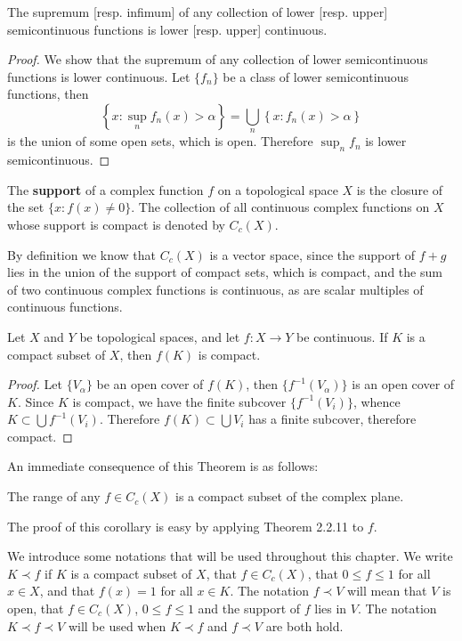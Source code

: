 \begin{proposition}
The supremum [resp. infimum] of any collection of lower [resp. upper] semicontinuous functions is lower [resp. upper] continuous.
\end{proposition}
\begin{proof}
We show that the supremum of any collection of lower semicontinuous functions is lower continuous. Let $\{f_n\}$ be a class of lower semicontinuous functions, then 
$$
\left\{ x:\mathop {\mathrm{sup}} \limits_{n}f_n\left( x \right) >\alpha \right\} =\bigcup_n{\left\{ x:f_n\left( x \right) >\alpha \right\}}
$$
is the union of some open sets, which is open. Therefore $\sup_nf_n$ is lower semicontinuous.
\end{proof}
\begin{definition}
The \textbf{support} of a complex function $f$ on a topological space $X$ is the closure of the set $\{x:f(x)\ne 0\}$. The collection of all continuous complex functions on $X$ whose support is compact is denoted by $C_c(X)$.
\end{definition}
By definition we know that $C_c(X)$ is a vector space, since the support of $f+g$ lies in the union of the support of compact sets, which is compact, and the sum of two continuous complex functions is continuous, as are scalar multiples of continuous functions.
\begin{theorem}
Let $X$ and $Y$ be topological spaces, and let $f:X\to Y$ be continuous. If $K$ is a compact subset of $X$, then $f(K)$ is compact.
\end{theorem}
\begin{proof}
Let $\{V_\alpha\}$ be an open cover of $f(K)$, then $\{f^{-1}(V_\alpha)\}$ is an open cover of $K$. Since $K$ is compact, we have the finite subcover $\{f^{-1}(V_i)\}$, whence $K\subset\bigcup f^{-1}(V_i)$. Therefore $f(K)\subset\bigcup V_i$ has a finite subcover, therefore compact.
\end{proof}
An immediate consequence of this Theorem is as follows:
\begin{corollary}
The range of any $f\in C_c(X)$ is a compact subset of the complex plane.
\end{corollary}
The proof of this corollary is easy by applying Theorem 2.2.11 to $f$.\par
We introduce some notations that will be used throughout this chapter. We write $K\prec f$ if $K$ is a compact subset of $X$, that $f\in C_c(X)$, that $0\le f\le 1$ for all $x\in X$, and that $f(x)=1$ for all $x\in K$. The notation $f\prec V$ will mean that $V$ is open, that $f\in C_c(X)$, $0\le f\le 1$ and the support of $f$ lies in $V$. The notation $K\prec f\prec V$ will be used when $K\prec f$ and $f\prec V$ are both hold.\par
